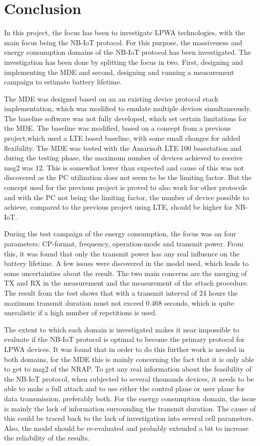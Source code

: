 \chapter{Conclusion}
\label{ch:con}
In this project, the focus has been to investigate LPWA technologies, with the main focus being the NB-IoT protocol. For this purpose, the massiveness and energy consumption domains of the NB-IoT protocol has been investigated. The investigation has been done by splitting the focus in two. First, designing and implementing the MDE and second, designing and running a measurement campaign to estimate battery lifetime. 

The MDE was designed based on an an existing device protocol stack implementation, which was modified to emulate multiple devices simultaneously. The baseline software was not fully developed, which set certain limitations for the MDE. The baseline was modified, based on a concept from a previous project,which used a LTE based baseline, with some small changes for added flexibility. The MDE was tested with the Amarisoft LTE 100 basestation and during the testing phase, the maximum number of devices achieved to receive msg2 was 12. This is somewhat lower than expected and cause of this was not discovered as the PC utilization does not seem to be the limiting factor. But the concept used for the previous project is proved to also work for other protocols and with the PC not being the limiting factor, the number of device possible to achieve, compared to the previous project using LTE, should be higher for NB-IoT.

During the test campaign of the energy consumption, the focus was on four parameters: CP-format, frequency, operation-mode and transmit power. From this, it was found that only the transmit power has any real influence on the battery lifetime. A few issues were discovered in the model used, which leads to some uncertainties about the result. The two main concerns are the merging of TX and RX in the measurement and the measurement of the attach procedure. The result from the test shows that with a transmit interval of 24 hours the maximum transmit duration must not exceed 0.468 seconds, which is quite unrealistic if a high number of repetitions is used. 

The extent to which each domain is investigated makes it near impossible to evaluate if the NB-IoT protocol is optimal to become the primary protocol for LPWA devices. It was found that in order to do this further work is needed in both domains, for the MDE this is mainly concerning the fact that it is only able to get to msg2 of the NRAP. To get any real information about the feasibility of the NB-IoT protocol, when subjected to several thousands devices, it needs to be able to make a full attach and to use either the control plane or user plane for data transmission, preferably both. For the energy consumption domain, the issue is mainly the lack of information surrounding the transmit duration. The cause of this could be traced back to the lack of investigation into several cell parameters. Also, the model should be re-evaluated and probably extended a bit to increase the reliability of the results. 




